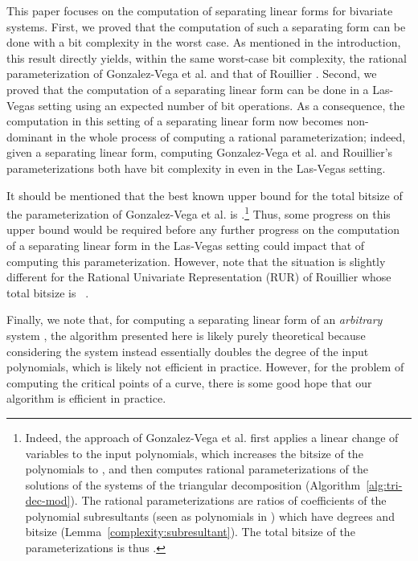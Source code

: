 \documentclass{sig-alternate}
\newcommand{\blue}[1]{\color{blue}#1\color{black}\xspace}
\renewcommand{\blue}[1]{#1\xspace}
\begin{document}
This paper focuses on the computation of separating linear forms for bivariate systems.  First, we
proved that the computation of such a separating form can be done with a bit complexity
 in the worst case.  As mentioned in the introduction, this result directly
yields, within the same worst-case bit complexity, the rational parameterization of Gonzalez-Vega et
al. \cite{VegKah:curve2d:96,det-jsc-2009} and 
 that of Rouillier
\cite{Rou99,bouzidiJSC2014a}. Second, we proved that the computation of a separating linear
form can be done in a Las-Vegas setting using an expected number of  bit
operations.  As a consequence, the computation in this setting of a separating linear form now becomes
non-dominant in the whole process of computing a rational parameterization; \blue{indeed, given a
separating linear form, computing Gonzalez-Vega et al. and 
Rouillier's parameterizations both have bit
complexity in  even in the Las-Vegas setting.


It should be mentioned that the best known upper bound for the total bitsize of the parameterization
of Gonzalez-Vega et al. is .\footnote{\small Indeed, the approach of Gonzalez-Vega
  et al. first applies a linear change of variables to the input polynomials, which increases the
  bitsize of the polynomials to , and then computes rational parameterizations
  of the solutions of the  systems of the triangular decomposition
  (Algorithm~\ref{alg:tri-dec-mod}). The rational parameterizations are ratios of coefficients of
  the polynomial subresultants (seen as polynomials in ) which have degrees  and bitsize
   (Lemma~\ref{complexity:subresultant}). The total bitsize of the
   parameterizations is thus .}  Thus, some progress on this upper bound
would be required before any further progress on the computation of a separating linear form in the
Las-Vegas setting could impact that of computing this parameterization.  However, note that the
situation is slightly different for the Rational Univariate Representation (RUR) of Rouillier
\cite{Rou99} whose total bitsize is ~\cite[Theorem 22]{bouzidiJSC2014a}.


Finally, we note that, for computing a separating linear form of an
\emph{arbitrary} system ,  the algorithm presented here is likely purely theoretical
because considering the system  instead  essentially doubles the
degree of the input polynomials, which is likely not efficient in practice. However, for the problem
of computing the critical points of a curve, there is some
good hope that our  algorithm is efficient in practice.}





     









\small

 
\end{document}
